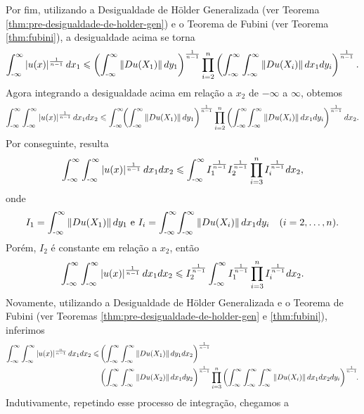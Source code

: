 \begin{prf}
\[    \]
    Por fim, utilizando a Desigualdade de Hölder Generalizada (ver Teorema \ref{thm:pre-desigualdade-de-holder-gen}) e o Teorema de Fubini (ver Teorema \ref{thm:fubini}), a desigualdade acima se torna
    \[
        \int_{\text{-}\infty}^{\infty} |u(x)|^{\frac{1}{n-1}} \,dx_1 \leqslant \left( \int_{\text{-}\infty}^{\infty} \Vert Du(X_1)\Vert \,dy_1 \right)^{\frac{1}{n-1}}\prod_{i=2}^n \left(\int_{\text{-}\infty}^{\infty}   \int_{\text{-}\infty}^{\infty} \Vert Du(X_i) \Vert \, dx_1dy_i\right)^{\frac{1}{n-1}}.
    \]
    Agora integrando a desigualdade acima em relação a $x_2$ de $-\infty$ a $\infty$, obtemos
    \[
        \int_{\text{-}\infty}^{\infty}\int_{\text{-}\infty}^{\infty} |u(x)|^{\frac{1}{n-1}} \,dx_1dx_2 \leqslant \int_{\text{-}\infty}^{\infty}\!\!\left( \int_{\text{-}\infty}^{\infty} \Vert Du(X_1)\Vert \,dy_1 \right)^{\frac{1}{n-1}}\prod_{i=2}^n \left(\int_{\text{-}\infty}^{\infty} \!\int_{\text{-}\infty}^{\infty} \Vert Du(X_i) \Vert \, dx_1dy_i\right)^{\frac{1}{n-1}} dx_2.
    \]
    Por conseguinte, resulta
    \[
        \int_{\text{-}\infty}^{\infty}\int_{\text{-}\infty}^{\infty} |u(x)|^{\frac{1}{n-1}} \,dx_1dx_2 \leqslant \int_{\text{-}\infty}^{\infty} I_1^{\frac{1}{n-1}}I_2^{\frac{1}{n-1}}\prod_{i=3}^n I_i^{\frac{1}{n-1}} dx_2,
    \]
    onde
    \[
        I_1 = \int_{\text{-}\infty}^{\infty} \Vert Du(X_1)\Vert \,dy_1 \text{ e } I_i = \int_{\text{-}\infty}^{\infty} \!\int_{\text{-}\infty}^{\infty} \Vert Du(X_i) \Vert \, dx_1dy_i \quad(i = 2,\dots,n).
    \]
    Porém, $I_2$ é constante em relação a $x_2$, então
    \[
        \int_{\text{-}\infty}^{\infty}\int_{\text{-}\infty}^{\infty} |u(x)|^{\frac{1}{n-1}} \,dx_1dx_2 \leqslant I_2^{\frac{1}{n-1}}\int_{\text{-}\infty}^{\infty} I_1^{\frac{1}{n-1}}\prod_{i=3}^n I_i^{\frac{1}{n-1}} dx_2.
    \]
    Novamente, utilizando a Desigualdade de Hölder Generalizada e o Teorema de Fubini (ver Teoremas \ref{thm:pre-desigualdade-de-holder-gen} e \ref{thm:fubini}), inferimos
    {\small
    \[
        \begin{aligned}
            \int_{\text{-}\infty}^{\infty}\int_{\text{-}\infty}^{\infty} |u(x)|^{\frac{n}{n-1}} \,dx_1dx_2 \leqslant &\left( \int_{\text{-}\infty}^{\infty} \int_{\text{-}\infty}^{\infty} \Vert Du(X_1) \Vert \,dy_1 dx_2 \right)^{\frac{1}{n-1}}\\ &\left( \int_{\text{-}\infty}^{\infty} \int_{\text{-}\infty}^{\infty} \Vert Du(X_2) \Vert \,dx_1 dy_2 \right)^{\frac{1}{n-1}} \prod_{i=3}^n \left( \int_{\text{-}\infty}^{\infty}\int_{\text{-}\infty}^{\infty}\int_{\text{-}\infty}^{\infty} \Vert Du(X_i) \Vert \,dx_1dx_2dy_i \right)^{\frac{1}{n-1}} \!\!.
        \end{aligned}
    \]\!}
    Indutivamente, repetindo esse processo de integração, chegamos a

\end{prf}
